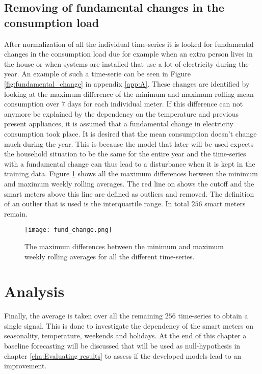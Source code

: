 \subsection{Removing of fundamental changes in the consumption load} 
After normalization of all the individual time-series it is looked for fundamental changes in the consumption load due for example when an extra person lives in the house or when systems are installed that use a lot of electricity during the year. An example of such a time-serie can be seen in Figure \ref{fig:fundamental_change} in appendix \ref{app:A}.
These changes are identified by looking at the maximum difference of the minimum and maximum rolling mean consumption over $ 7 $ days for each individual meter. If this difference can not anymore be explained by the dependency on the temperature and previous present appliances, it is assumed that a fundamental change in electricity consumption took place. It is desired that the mean consumption doesn't change much during the year. This is because the model that later will be used expects the household situation to be the same for the entire year and the time-series with a fundamental change can thus lead to a disturbance when it is kept in the training data. Figure \ref{fig:fund_change} shows all the maximum differences between the minimum and maximum weekly rolling averages. The red line on shows the cutoff and the smart meters above this line are defined as outliers and removed. The definition of an outlier that is used is the interquartile range. In total $ 256 $ smart meters remain. 


\begin{figure}[h!]
	\centering
	\texttt{[image: fund\_change.png]}
	\caption{The maximum differences between the minimum and maximum weekly rolling averages for all the different time-series.}
	\label{fig:fund_change}
\end{figure}




\section{Analysis}\label{s:Analysis}
Finally, the average is taken over all the remaining $256$ time-series to obtain a single signal. This is done to investigate the dependency of the smart meters on seasonality, temperature, weekends and holidays. At the end of this chapter a baseline forecasting will be discussed that will be used as null-hypothesis in chapter \ref{cha:Evaluating results} to assess if the developed models lead to an improvement.

